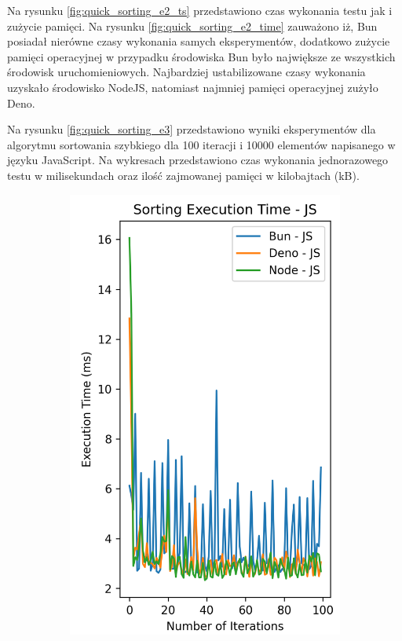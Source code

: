 Na rysunku \ref{fig:quick_sorting_e2_ts} przedstawiono czas wykonania testu jak i zużycie pamięci. Na rysunku \ref{fig:quick_sorting_e2_time} zauważono iż, Bun posiadał nierówne czasy wykonania samych eksperymentów, dodatkowo zużycie pamięci operacyjnej w przypadku środowiska Bun było największe ze wszystkich środowisk uruchomieniowych. Najbardziej ustabilizowane czasy wykonania uzyskało środowisko NodeJS, natomiast najmniej pamięci operacyjnej zużyło Deno.

Na rysunku \ref{fig:quick_sorting_e3} przedstawiono wyniki eksperymentów dla algorytmu sortowania szybkiego dla 100 iteracji i 10000 elementów napisanego w języku JavaScript. Na wykresach przedstawiono czas wykonania jednorazowego testu w milisekundach oraz ilość zajmowanej pamięci w kilobajtach (kB).

\begin{figure}[H]
  \centering
  \begin{subfigure}[b]{0.44\textwidth}
    \centering
    \includegraphics[width=\textwidth]{Figures/sorting/sorting_quick_100_10000_js_time.png}

\end{subfigure}
\end{figure}
